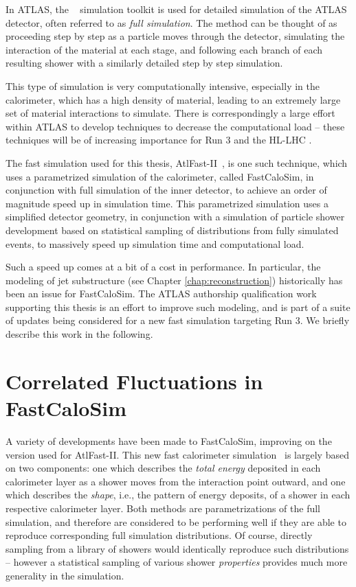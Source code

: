 In ATLAS, the \GEANT~\cite{GEANT4} simulation toolkit is used for detailed simulation of the ATLAS detector, often 
referred to as \emph{full simulation}. The method can be thought of as proceeding step by step as a particle moves 
through the detector, simulating the interaction of the material at each stage, and following each branch of each resulting 
shower with a similarly detailed step by step simulation. 

This type of simulation is very computationally intensive, especially in the calorimeter, which has a high density of 
material, leading to an extremely large set of material interactions to simulate. There is correspondingly a large 
effort within ATLAS to develop techniques to decrease the computational load -- these techniques will be of increasing 
importance for Run 3 and the HL-LHC .

The fast simulation used for this thesis, AtlFast-II~\cite{SOFT-2010-01}, is one such technique, which uses
a parametrized simulation of the calorimeter, called FastCaloSim, in conjunction with full simulation of the 
inner detector, to achieve an order of magnitude speed up in simulation time. This parametrized simulation uses 
a simplified detector geometry, in conjunction with a simulation of particle shower development based on statistical 
sampling of distributions from fully simulated events, to massively speed up simulation time and computational load.

Such a speed up comes at a bit of a cost in performance. In particular, the modeling of jet substructure (see Chapter 
\ref{chap:reconstruction}) historically has been an issue for FastCaloSim. The ATLAS authorship qualification work 
supporting this thesis is an effort to improve such modeling, and is part of a suite of updates being considered for 
a new fast simulation targeting Run 3. We briefly describe this work in the following.

\section{Correlated Fluctuations in FastCaloSim}
A variety of developments have been made to FastCaloSim, improving on the version used 
for AtlFast-II. This new fast calorimeter simulation~\cite{ATL-SOFT-PUB-2018-002} is largely 
based on two components: one which describes the \emph{total energy} deposited in each calorimeter layer as a 
shower moves from the interaction point outward, and one which describes the \emph{shape}, i.e., the 
pattern of energy deposits, of a shower in each respective calorimeter layer. Both methods are 
parametrizations of the full simulation, and therefore are considered to be performing well if 
they are able to reproduce corresponding full simulation distributions. Of course, directly sampling 
from a library of showers would identically reproduce such distributions -- however a statistical 
sampling of various shower \emph{properties} provides much more generality in the simulation.

